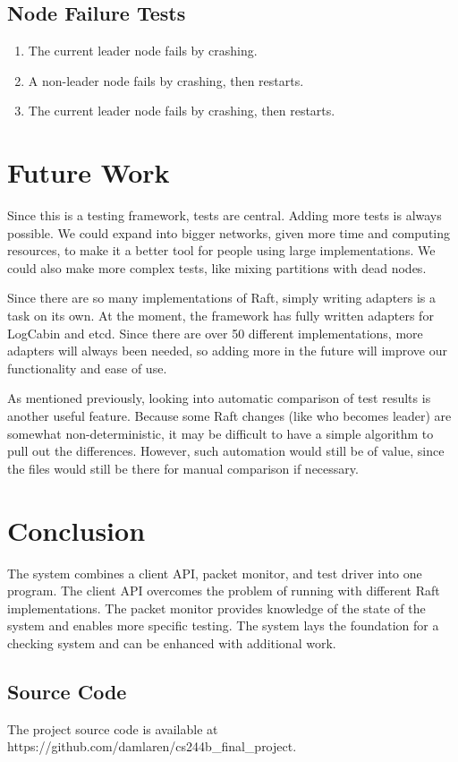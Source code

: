 \documentclass[UTF8]{article}
\begin{document}
\subsection{Node Failure Tests}
\begin{enumerate}
  \item The current leader node fails by crashing.
  \item A non-leader node fails by crashing, then restarts.
  \item The current leader node fails by crashing, then restarts. 
\end{enumerate}

\section{Future Work}

Since this is a testing framework, tests are central. Adding more tests is always possible. We could expand into bigger networks, given more time and computing resources, to make it a better tool for people using large implementations. We could also make more complex tests, like mixing partitions with dead nodes.

Since there are so many implementations of Raft, simply writing adapters is a task on its own. At the moment, the framework has fully written adapters for LogCabin and etcd. Since there are over 50 different implementations, more adapters will always been needed, so adding more in the future will improve our functionality and ease of use.

As mentioned previously, looking into automatic comparison of test results is another useful feature. Because some Raft changes (like who becomes leader) are somewhat non-deterministic, it may be difficult to have a simple algorithm to pull out the differences. However, such automation would still be of value, since the files would still be there for manual comparison if necessary.

\section{Conclusion}

The system combines a client API, packet monitor, and test driver into one program. The client API overcomes the problem of running with different Raft implementations. The packet monitor provides knowledge of the state of the system and enables more specific testing. The system lays the foundation for a checking system and can be enhanced with additional work.

\subsection{Source Code}

The project source code is available at https://github.com/damlaren/cs244b\_final\_project.



\end{document}
